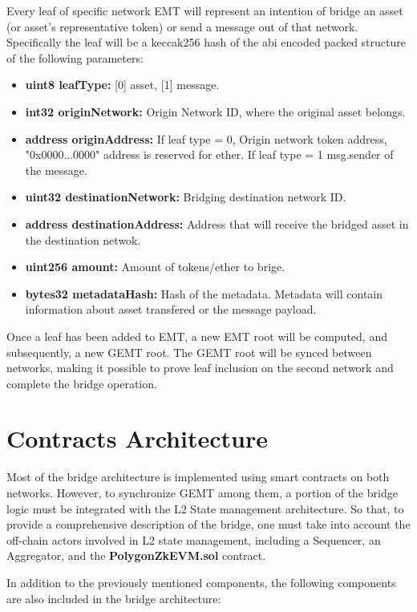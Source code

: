 Every leaf of specific network EMT will represent an intention of bridge an asset (or asset's representative token) or send a message out of that network. Specifically the leaf will be a keccak256 hash of the abi encoded packed structure of the following parameters:

\begin{itemize}
	\item \textbf{uint8 leafType:} [0] asset, [1] message.
	\item \textbf{int32 originNetwork:} Origin Network ID, where the original asset belongs.
	\item \textbf{address originAddress:} If leaf type = 0, Origin network token address, "0x0000...0000" address is reserved for ether. If leaf type = 1 msg.sender of the message.
	\item \textbf{uint32 destinationNetwork:} Bridging destination network ID.
	\item \textbf{address destinationAddress:} Address that will receive the bridged asset in the destination netwok.
	\item \textbf{uint256 amount:} Amount of tokens/ether to brige.
	\item \textbf{bytes32 metadataHash:} Hash of the metadata. Metadata will contain information about asset transfered or the message payload.
\end{itemize}

Once a leaf has been added to EMT, a new EMT root will be computed, and subsequently, a new GEMT root. The GEMT root will be synced between networks, making it possible to prove leaf inclusion on the second network and complete the bridge operation.

\section{Contracts Architecture}

Most of the bridge architecture is implemented using smart contracts on both networks. However, to synchronize GEMT among them, a portion of the bridge logic must be integrated with the L2 State management architecture. So that, to provide a comprehensive description of the bridge, one must take into account the off-chain actors involved in L2 state management, including a Sequencer, an Aggregator, and the \textbf{PolygonZkEVM.sol} contract.

In addition to the previously mentioned components, the following components are also included in the bridge architecture:


